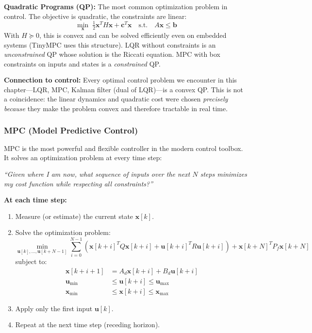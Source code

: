 \textbf{Quadratic Programs (QP):} The most common optimization problem in control. The objective is quadratic, the constraints are linear:
\[
\min_{\mathbf{x}} \; \tfrac{1}{2}\mathbf{x}^T H \mathbf{x} + \mathbf{c}^T \mathbf{x} \quad \text{s.t.} \quad A\mathbf{x} \leq \mathbf{b}
\]
With $H \succeq 0$, this is convex and can be solved efficiently even on embedded systems (TinyMPC uses this structure). LQR without constraints is an \textit{unconstrained} QP whose solution is the Riccati equation. MPC with box constraints on inputs and states is a \textit{constrained} QP.

\textbf{Connection to control:} Every optimal control problem we encounter in this chapter---LQR, MPC, Kalman filter (dual of LQR)---is a convex QP. This is not a coincidence: the linear dynamics and quadratic cost were chosen \textit{precisely because} they make the problem convex and therefore tractable in real time.

\subsubsection{MPC (Model Predictive Control)}

MPC is the most powerful and flexible controller in the modern control toolbox. It solves an optimization problem at every time step:

\textit{``Given where I am now, what sequence of inputs over the next $N$ steps minimizes my cost function while respecting all constraints?''}

\textbf{At each time step:}
\begin{enumerate}
    \item Measure (or estimate) the current state $\mathbf{x}[k]$.
    \item Solve the optimization problem:
    \begin{equation}
    \min_{\mathbf{u}[k], \ldots, \mathbf{u}[k+N-1]} \sum_{i=0}^{N-1} \left( \mathbf{x}[k+i]^T Q \mathbf{x}[k+i] + \mathbf{u}[k+i]^T R \mathbf{u}[k+i] \right) + \mathbf{x}[k+N]^T P_f \mathbf{x}[k+N]
    \end{equation}
    subject to:
    \begin{align}
    \mathbf{x}[k+i+1] &= A_d \mathbf{x}[k+i] + B_d \mathbf{u}[k+i] \\
    \mathbf{u}_{\min} &\leq \mathbf{u}[k+i] \leq \mathbf{u}_{\max} \\
    \mathbf{x}_{\min} &\leq \mathbf{x}[k+i] \leq \mathbf{x}_{\max}
    \end{align}
    \item Apply only the first input $\mathbf{u}[k]$.
    \item Repeat at the next time step (receding horizon).
\end{enumerate}

